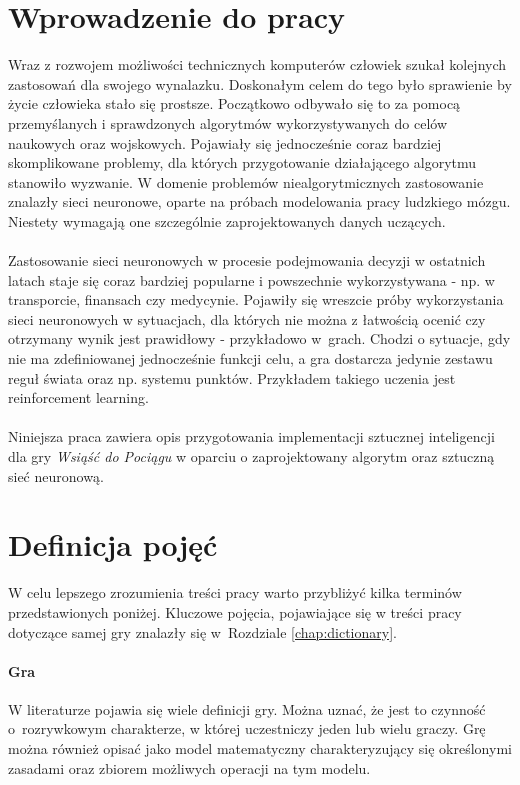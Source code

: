 \documentclass[12pt, oneside]{report}
\begin{document}
	\section{Wprowadzenie do pracy}
	Wraz z rozwojem możliwości technicznych komputerów człowiek szukał kolejnych zastosowań dla swojego wynalazku. Doskonałym celem do tego było sprawienie by życie człowieka stało się prostsze. Początkowo odbywało się to za pomocą przemyślanych i sprawdzonych algorytmów wykorzystywanych do celów naukowych oraz wojskowych. Pojawiały się jednocześnie coraz bardziej skomplikowane problemy, dla których przygotowanie działającego algorytmu stanowiło wyzwanie. 
	W domenie problemów niealgorytmicznych zastosowanie znalazły sieci neuronowe, oparte na próbach modelowania pracy ludzkiego mózgu. Niestety wymagają one szczególnie zaprojektowanych danych uczących.
	\\ \\
	Zastosowanie sieci neuronowych w procesie podejmowania decyzji w ostatnich latach staje się coraz bardziej popularne i powszechnie wykorzystywana - np. w transporcie, finansach czy medycynie. Pojawiły się wreszcie próby wykorzystania sieci neuronowych w sytuacjach, dla których nie można z łatwością ocenić czy otrzymany wynik jest prawidłowy - przykładowo w~grach. Chodzi o sytuacje, gdy nie ma zdefiniowanej jednocześnie funkcji celu, a gra dostarcza jedynie zestawu reguł świata oraz np. systemu punktów. Przykładem takiego uczenia jest reinforcement learning.   \\ \\ 
	Niniejsza praca zawiera opis przygotowania implementacji sztucznej inteligencji dla gry \textit{Wsiąść do Pociągu} w oparciu o zaprojektowany algorytm oraz sztuczną sieć neuronową. 
	\section{Definicja pojęć}
	\label{section:Definitions}
	W celu lepszego zrozumienia treści pracy warto przybliżyć kilka terminów przedstawionych poniżej. Kluczowe pojęcia, pojawiające się w treści pracy dotyczące samej gry znalazły się w~Rozdziale \ref{chap:dictionary}.
	\paragraph{Gra} W literaturze pojawia się wiele definicji gry. Można uznać, że jest to czynność o~rozrywkowym charakterze, w której uczestniczy jeden lub wielu graczy. Grę można również opisać jako model matematyczny charakteryzujący się określonymi zasadami oraz zbiorem możliwych operacji na tym modelu.
\end{document}
